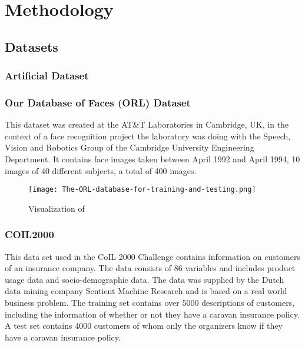 \chapter{Methodology}






\section{Datasets}

\subsection{Artificial Dataset}
\subsection{Our Database of Faces (ORL) Dataset}
This dataset was created at the AT\&T Laboratories in Cambridge, UK, in the context of a face recognition project the laboratory was doing with the Speech, Vision and Robotics Group of the Cambridge University Engineering Department. It contains face images taken between April 1992 and April 1994, 10 images of 40 different subjects, a total of 400 images.

\begin{figure}
    \centering
    \texttt{[image: The-ORL-database-for-training-and-testing.png]}
    \caption{Visualization of }
    \label{fig:orl_faces}
\end{figure}

\subsection{COIL2000}
This data set used in the CoIL 2000 Challenge contains information on customers of an insurance company. The data consists of 86 variables and includes product usage data and socio-demographic data. The data was supplied by the Dutch data mining company Sentient Machine Research and is based on a real world business problem. The training set contains over 5000 descriptions of customers, including the information of whether or not they have a caravan insurance policy. A test set contains 4000 customers of whom only the organizers know if they have a caravan insurance policy.

